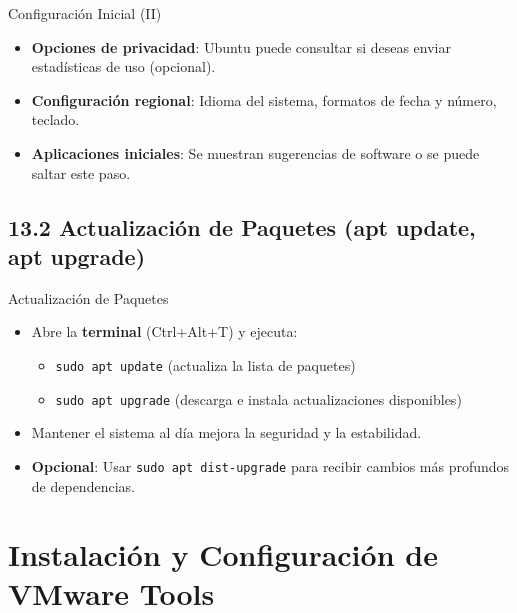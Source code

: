 \documentclass{beamer}
\begin{document}
\begin{frame}{Configuración Inicial (II)}
    \begin{itemize}
        \item \textbf{Opciones de privacidad}: Ubuntu puede consultar si deseas enviar estadísticas de uso (opcional).
        \item \textbf{Configuración regional}: Idioma del sistema, formatos de fecha y número, teclado.
        \item \textbf{Aplicaciones iniciales}: Se muestran sugerencias de software o se puede saltar este paso.
    \end{itemize}
\end{frame}

\subsection{13.2 Actualización de Paquetes (apt update, apt upgrade)}
\begin{frame}{Actualización de Paquetes}
    \begin{itemize}
        \item Abre la \textbf{terminal} (Ctrl+Alt+T) y ejecuta:
        \begin{itemize}
            \item \texttt{sudo apt update} (actualiza la lista de paquetes)
            \item \texttt{sudo apt upgrade} (descarga e instala actualizaciones disponibles)
        \end{itemize}
        \item Mantener el sistema al día mejora la seguridad y la estabilidad.
        \item \textbf{Opcional}: Usar \texttt{sudo apt dist-upgrade} para recibir cambios más profundos de dependencias.
    \end{itemize}
\end{frame}

\section{Instalación y Configuración de VMware Tools}

\end{document}
